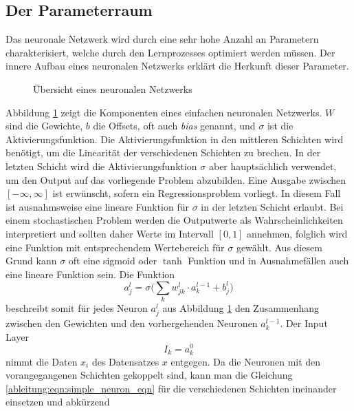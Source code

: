 \subsection{Der Parameterraum}
Das neuronale Netzwerk wird durch eine sehr hohe Anzahl an Parametern
charakterisiert, welche durch den Lernprozesses optimiert werden
müssen.
Der innere Aufbau eines neuronalen Netzwerks erklärt die Herkunft
dieser Parameter.
\begin{figure}
	\begin{center}
		
		\caption{Übersicht eines neuronalen Netzwerks}
		\label{ableitung:fig:neuronal_network}
	\end{center}
\end{figure} 
Abbildung \ref{ableitung:fig:neuronal_network} zeigt die Komponenten eines einfachen neuronalen Netzwerks.
$W$ sind die Gewichte, $b$ die Offsets, oft auch \textit{bias} genannt, und $\sigma$ ist die Aktivierungsfunktion.
%
%
%
Die Aktivierungsfunktion in den mittleren Schichten wird benötigt, um die Linearität der verschiedenen Schichten zu brechen.
%
In der letzten Schicht wird die Aktivierungsfunktion $\sigma$ aber hauptsächlich verwendet, um den Output auf das vorliegende Problem abzubilden.
Eine Ausgabe zwischen $[-\infty, \infty]$ ist erwünscht, sofern ein Regressionsproblem vorliegt.
In diesem Fall ist ausnahmsweise eine lineare Funktion für $\sigma$
in der letzten Schicht erlaubt.
Bei einem stochastischen Problem werden die Outputwerte als
Wahrscheinlichkeiten interpretiert und sollten daher Werte im Intervall
$[0,1]$ annehmen, folglich wird eine Funktion mit entsprechendem
Wertebereich für $\sigma$ gewählt.
Aus diesem Grund kann $\sigma$ oft eine  sigmoid oder $\tanh$
Funktion und in Ausnahmefällen auch eine lineare Funktion sein.
Die Funktion
\begin{equation}
a^{l}_{j} = \sigma \biggl( \sum\limits_{k}w^{l}_{jk} \cdot a^{l-1}_{k}+b^{l}_{j} \biggr)
\label{ableitung:eqn:simple_neuron_eqn}
\end{equation}
beschreibt somit für jedes Neuron $a^{l}_{j}$ aus Abbildung
\ref{ableitung:fig:neuronal_network} den Zusammenhang zwischen den
Gewichten und den vorhergehenden Neuronen $a^{l-1}_{k}$.
%
Der Input Layer 
\begin{equation}
I_k = a_{k}^{0}
\end{equation}
nimmt die Daten $x_i$ des Datensatzes $x$ entgegen.
Da die Neuronen mit den vorangegangenen Schichten gekoppelt sind, kann man die Gleichung \eqref{ableitung:eqn:simple_neuron_eqn} für die verschiedenen Schichten ineinander einsetzen und abkürzend

